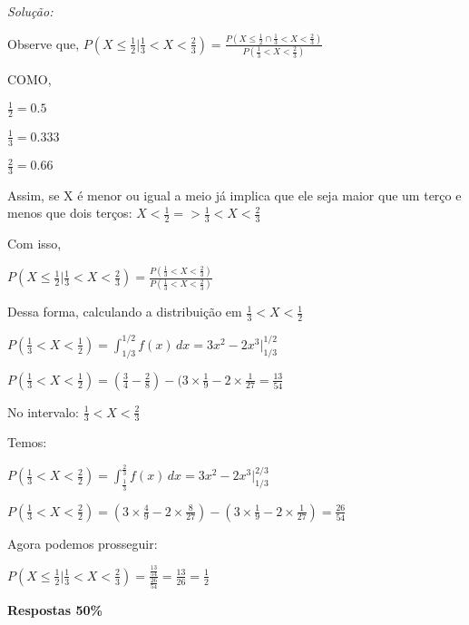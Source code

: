 \documentclass{article}
\newenvironment{solution}
    {\textit{Solução:}}
    {}
\begin{document}
\begin{solution}

Observe que, $P(X \leq \frac{1}{2} | \frac{1}{3} < X < \frac{2}{3}) = \frac{P(X \leq \frac{1}{2} \cap \frac{1}{3} < X < \frac{2}{3})}  {P(\frac{1}{3} < X < \frac{2}{3})}$

COMO,

$\frac{1}{2} = 0.5$

$\frac{1}{3} = 0.333$

$\frac{2}{3} = 0.66$


Assim, se X é menor ou igual a meio já implica que ele seja maior que um terço e menos que dois terços: $X < \frac{1}{2} => \frac{1}{3} < X < \frac{2}{3}$

Com isso,

$P(X \leq \frac{1}{2} | \frac{1}{3} < X < \frac{2}{3}) = \frac{P(\frac{1}{3} < X < \frac{2}{3})}{P(\frac{1}{3} < X < \frac{2}{3})}$

Dessa forma, calculando a distribuição em $\frac{1}{3}<X<\frac{1}{2}$

$P(\frac{1}{3}<X<\frac{1}{2}) = \int_{1/3}^{1/2} f(x) \, dx = 3x^{2} - 2x^{3}|_{1/3}^{1/2}$

$P(\frac{1}{3}<X<\frac{1}{2}) = (\frac{3}{4} - \frac{2}{8}) - (3 \times \frac{1}{9} - 2 \times \frac{1}{27} = \frac{13}{54}$

No intervalo: $\frac{1}{3}<X<\frac{2}{3}$

Temos:

$P(\frac{1}{3}<X<\frac{2}{2}) = \int_{\frac{1}{3}}^{\frac{2}{3}} f(x) \, dx = 3x^{2} - 2x^{3}|_{1/3}^{2/3}$

$P(\frac{1}{3}<X<\frac{2}{2}) = (3 \times \frac{4}{9} - 2 \times \frac{8}{27}) - (3 \times \frac{1}{9} - 2 \times \frac{1}{27}) = \frac{26}{54}$

Agora podemos prosseguir:



$P(X \leq \frac{1}{2} | \frac{1}{3} < X < \frac{2}{3}) = \frac{\frac{13}{54}}{\frac{26}{54}} = \frac{13}{26} = \frac{1}{2}$

\textbf{Respostas 50\%}


\end{solution}
\end{document}
